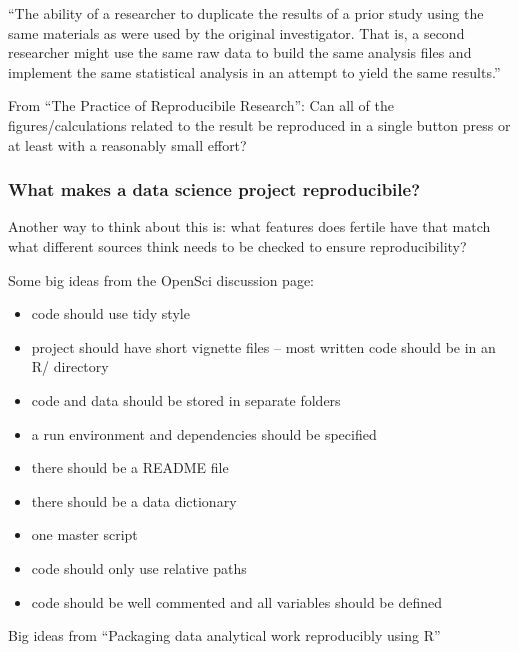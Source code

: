 \documentclass[12pt]{article}
\providecommand{\tightlist}{%
  \setlength{\itemsep}{0pt}\setlength{\parskip}{0pt}}
\begin{document}
``The ability of a researcher to duplicate the results of a prior study
using the same materials as were used by the original investigator. That
is, a second researcher might use the same raw data to build the same
analysis files and implement the same statistical analysis in an attempt
to yield the same results.''

\citet{goodman2016does}

From ``The Practice of Reproducibile Research'': Can all of the
figures/calculations related to the result be reproduced in a single
button press or at least with a reasonably small effort?

\citet{kitzes2017practice}

\subsubsection{What makes a data science project
reproducibile?}\label{what-makes-a-data-science-project-reproducibile}

Another way to think about this is: what features does fertile have that
match what different sources think needs to be checked to ensure
reproducibility?

Some big ideas from the OpenSci discussion page:

\begin{itemize}
\tightlist
\item
  code should use tidy style
\item
  project should have short vignette files -- most written code should
  be in an R/ directory
\item
  code and data should be stored in separate folders
\item
  a run environment and dependencies should be specified
\item
  there should be a README file
\item
  there should be a data dictionary
\item
  one master script
\item
  code should only use relative paths
\item
  code should be well commented and all variables should be defined
\end{itemize}

Big ideas from ``Packaging data analytical work reproducibly using R''
\end{document}

